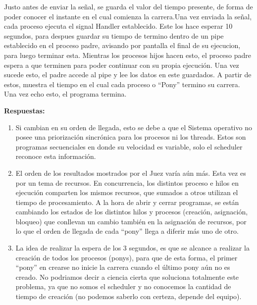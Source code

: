 \documentclass[spanish, fleqn]{article}
\begin{document}
\begin{enumerate}
 Justo antes de enviar la señal, se guarda el valor del tiempo presente, de forma de poder conocer el instante en el cual comienza la carrera.Una vez enviada la señal, cada proceso ejecuta el signal Handler establecido. Este los hace esperar 10 segundos, para despues guardar su tiempo de termino dentro de un pipe establecido en el proceso padre, avisando por pantalla el final de su ejecucion, para luego terminar esta. Mientras los procesos hijos hacen esto, el proceso padre espera a que terminen para poder continuar con su propia ejecución. Una vez sucede esto, el padre accede al pipe y lee los datos en este guardados. A partir de estos, muestra el tiempo en el cual cada proceso o ``Pony'' termino su carrera. Una vez echo esto, el programa termina.
\end{enumerate}

\textbf{\Large{Respuestas:}}
\begin{enumerate}

 \item
   Si cambian en su orden de llegada, esto se debe a que el Sistema operativo no posee una priorización sincrónica para los procesos ni los threads. Estos son programas secuenciales en donde su velocidad es variable, solo el scheduler reconoce esta información.  
 \item
   El orden de los resultados mostrados por el Juez varía aún más. Esta vez es por un tema de recursos. En concurrencia, los distintos proceso e hilos en ejecución comparten los mismos recursos, que sumados a otros utilizan el tiempo de procesamiento. A la hora de abrir y cerrar programas, se están cambiando los estados de los distintos hilos y procesos (creación, asignación, bloqueo) que conllevan un cambio también en la asignación de recursos, por lo que el orden de llegada de cada ``pony'' llega a diferir más uno de otro.   
 \item
  La idea de realizar la espera de los 3 segundos, es que se alcance a realizar la creación de todos los procesos (ponys), para que de esta forma, el primer ``pony'' en crearse no inicie la carrera cuando el último pony aún no es creado. No podriamos decir a ciencia cierta que soluciona totalmente este problema, ya que no somos el scheduler y no conocemos la cantidad de tiempo de creación (no podemos saberlo con certeza, depende del equipo).
 

 
  \end{enumerate}

\thispagestyle{empty}
\end{document}
